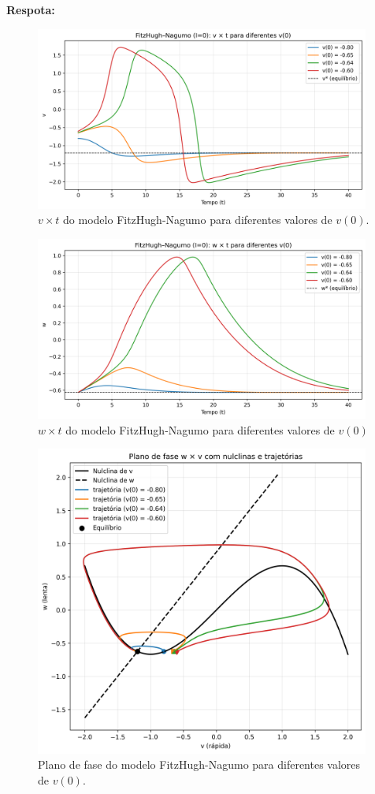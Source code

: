\documentclass[english,11pt,a4paper]{article}
\begin{document}
	\noindent\textbf{Respota:}
	
	\begin{figure}[H]
		\centering
		\includegraphics[width=11cm]{../figures/ex_1h_1.png}
		\caption{$v \times t$ do modelo FitzHugh-Nagumo para diferentes valores de $v(0)$.}
	\end{figure}
	
	\begin{figure}[H]
		\centering
		\includegraphics[width=11cm]{../figures/ex_1h_2.png}
		\caption{$w \times t$ do modelo FitzHugh-Nagumo para diferentes valores de $v(0)$}
	\end{figure}
	
	\begin{figure}[H]
		\centering
		\includegraphics[width=11cm]{../figures/ex_1h_3.png}
		\caption{Plano de fase do modelo FitzHugh-Nagumo para diferentes valores de $v(0)$.}
	\end{figure}
	
\end{document}
